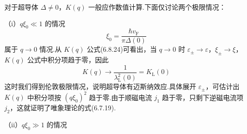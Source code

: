 对于超导体 $\Delta\neq0$，$K(q)$ 一般应作数值计算.下面仅讨论两个极限情况：

（i）$q\xi_{0}\ll1$ 的情况
\begin{equation*}
  \xi_{0}=\frac{\hbar v_{\mathrm{F}}}{\pi\Delta(0)}
\end{equation*}
属于 $q\to0$ 情况.从 $K(q)$ 公式(6.8.24)可看出，当 $q\to0$ 时 $\varepsilon_{\pm}\to\varepsilon$，$\xi_{\pm}\to\xi$，$K(q)$ 公式中积分项趋于零，因此
\begin{equation}
  K(q)\to\frac{1}{\lambda_{\mathrm{L}}^{2}(0)}=K_{\mathrm{L}}(0)
\end{equation}
这时我们得到伦敦极限情况，说明超导体有迈斯纳效应.具体展开 $\varepsilon_{\pm}$，可估计出 $K(q)$ 中积分项按 $\left(q\xi_{0}\right)^{2}$ 趋于零.由于顺磁电流 $j_{1}$ 趋于零，只剩下逆磁电流项 $j_{2}$，这就证明了唯象理论的式(6.7.19).

（ii）$q\xi_{0}\gg1$ 的情况


